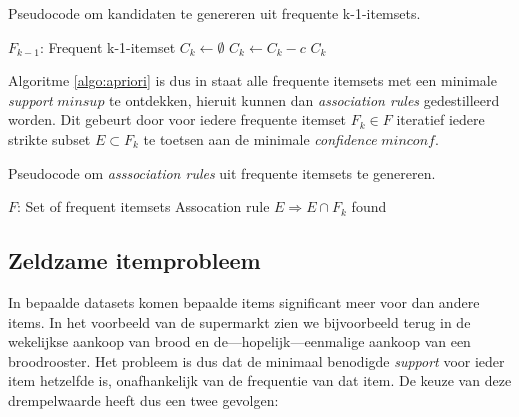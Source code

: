\begin{algorithm}
\caption{Pseudocode om kandidaten te genereren uit frequente k-1-itemsets.}
\label{algo:candidateGen}
\begin{algorithmic} 
\Require $F_{k-1}$: Frequent k-1-itemset
    \State $C_k \gets \emptyset$
            	\State $C_k \gets C_k - c$ 
            \EndIf
        \EndFor
    \EndFor
    \State \Return $C_k$ 
\EndFunction
\end{algorithmic}
\end{algorithm}
%
Algoritme \ref{algo:apriori} is dus in staat alle frequente itemsets met een minimale \emph{support} $minsup$ te ontdekken, hieruit kunnen dan \emph{association rules} gedestilleerd worden. Dit gebeurt door voor iedere frequente itemset $F_k \in F$ iteratief iedere strikte subset $E \subset F_k$ te toetsen aan de minimale \emph{confidence} $minconf$.
%
\begin{algorithm}
\caption{Pseudocode om \emph{asssociation rules} uit frequente itemsets te genereren.}
\label{algo:step_2}
\begin{algorithmic} 
\Require $F$: Set of frequent itemsets
            	\State Assocation rule $E \Rightarrow E \cap F_k$ found
            \EndIf
        \EndFor
    \EndFor
\EndFunction
\end{algorithmic}
\end{algorithm}
%
\subsection{Zeldzame itemprobleem}
In bepaalde datasets komen bepaalde items significant meer voor dan andere items. In het voorbeeld van de supermarkt zien we bijvoorbeeld terug in de wekelijkse aankoop van brood en de---hopelijk---eenmalige aankoop van een broodrooster. Het probleem is dus dat de minimaal benodigde \emph{support} voor ieder item hetzelfde is, onafhankelijk van de frequentie van dat item. De keuze van deze drempelwaarde heeft dus een twee gevolgen:

